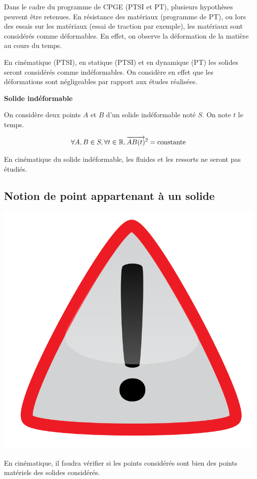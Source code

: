 \documentclass[10pt,oneside]{article}
\begin{document}
Dans le cadre du programme de CPGE (PTSI et PT), plusieurs hypothèses peuvent être retenues.
En résistance des matériaux (programme de PT), ou lors des essais sur les matériaux (essai de traction par exemple), les matériaux sont considérés comme déformables. En effet, on observe la déformation de la matière au cours du temps.

En cinématique (PTSI), en statique (PTSI) et en dynamique (PT) les solides seront considérés comme indéformables. On considère en effet que les déformations sont négligeables par rapport aux études réalisées.

\begin{hypo}
\textbf{Solide indéformable}

On considère deux points $A$ et $B$ d'un solide indéformable noté $S$. On note $t$ le temps.

$$
\forall A,B \in S, \forall t\in \mathbb{R}, \overrightarrow{AB(t)}^2 = \text{constante}
$$

\end{hypo}
\begin{rem}
En cinématique du solide indéformable, les fluides et les ressorts ne seront pas étudiés.
\end{rem}

\subsection{Notion de point appartenant à un solide}



\begin{warn}
\begin{minipage}[c]{.15\linewidth}
\begin{center}
\includegraphics[width=.8\textwidth]{png/warning3}
\end{center}
\end{minipage} \hfill
\begin{minipage}[c]{.8\linewidth}
En cinématique, il faudra vérifier si les points considérés sont bien des points matériels des solides considérés. 
\end{minipage}
\end{warn}
\end{document}
